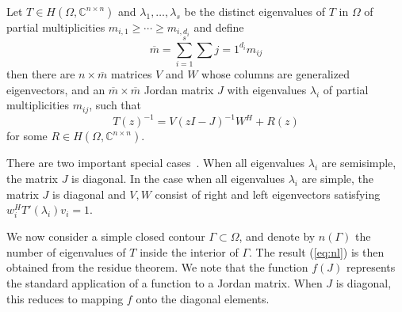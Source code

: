 \documentclass[onefignum,onetabnum]{siamart190516}
\begin{document}
	\begin{theorem}[Keldysh]
		Let \( T \in H(\Omega, \mathbb{C}^{n\times n}) \) and \( \lambda_1, \ldots, \lambda_s \) be the distinct eigenvalues of \( T \) in \( \Omega \) of partial multiplicities \( m_{i,1} \ge \cdots \ge m_{i,d_i} \) and define
		\begin{equation*}
			\overline{m} = \sum_{i=1}^s \sum{j=1}^{d_i} m_{ij}
		\end{equation*}
		then there are \( n \times \overline{m} \) matrices \( V \) and \( W \) whose columns are generalized eigenvectors, and an \( \overline{m} \times \overline{m} \) Jordan matrix \( J \) with eigenvalues \( \lambda_i \) of partial multiplicities \( m_{ij} \), such that
		\begin{equation*}
			{T(z)}^{-1} = V {(zI - J)}^{-1} W^H + R(z)
		\end{equation*}
		for some \( R \in H(\Omega, \mathbb{C}^{n\times n}) \).
	\end{theorem} 
	There are two important special cases~\cite{guttel2017}.
	When all eigenvalues \( \lambda_i \) are semisimple, the matrix \( J \) is diagonal.
	In the case when all eigenvalues \( \lambda_i \) are simple, the matrix \( J \) is diagonal and \( V, W \) consist of right and left eigenvectors satisfying \( w_i^H T'(\lambda_i) v_i = 1 \).

	We now consider a simple closed contour \( \Gamma \subset \Omega \), and denote by \( n(\Gamma) \) the number of eigenvalues of \( T \) inside the interior of \(  \Gamma \). 
	The result (\ref{eq:nl}) is then obtained from the residue theorem.
    We note that the function \( f(J) \) represents the standard application of a function to a Jordan matrix.
    When \( J \) is diagonal, this reduces to mapping \( f \) onto the diagonal elements.
    
\end{document}
